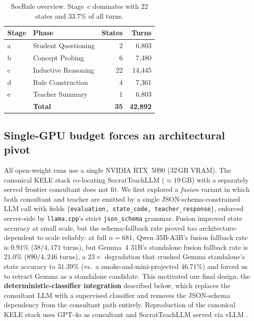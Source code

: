 \documentclass[11pt]{article}
\begin{document}
\begin{table}[t]
  \centering
  \small
  \begin{tabular}{@{}llrr@{}}
    \toprule
    \textbf{Stage} & \textbf{Phase} & \textbf{States} & \textbf{Turns} \\
    \midrule
    a & Student Questioning    & 2  & 6{,}803 \\
    b & Concept Probing        & 6  & 7{,}480 \\
    c & Inductive Reasoning    & 22 & 14{,}445 \\
    d & Rule Construction      & 4  & 7{,}361 \\
    e & Teacher Summary        & 1  & 6{,}803 \\
    \midrule
      & \textbf{Total}         & \textbf{35} & \textbf{42{,}892} \\
    \bottomrule
  \end{tabular}
  \caption{SocRule overview. Stage~c dominates with $22$ states and $33.7\%$ of all turns.}
  \label{tab:socrule}
\end{table}

\subsection{Single-GPU budget forces an architectural pivot}

All open-weight runs use a single NVIDIA RTX~5090 ($32$\,GB VRAM). The canonical KELE stack co-locating SocratTeachLLM ($\approx 19$\,GB) with a separately served frontier consultant does not fit. We first explored a \emph{fusion} variant in which both consultant and teacher are emitted by a single JSON-schema-constrained LLM call with fields $\{$\texttt{evaluation, state\_code, teacher\_response}$\}$, enforced server-side by \texttt{llama.cpp}'s strict \texttt{json\_schema} grammar. Fusion improved state accuracy at small scale, but the schema-fallback rate proved too architecture-dependent to scale reliably: at full $n{=}681$, Qwen 35B-A3B's fusion fallback rate is $0.91\%$ ($38/4{,}171$ turns), but Gemma~4 31B's standalone fusion fallback rate is $21.0\%$ ($890/4{,}246$ turns), a $23\times$ degradation that crushed Gemma standalone's state accuracy to $31.39\%$ (vs.\ a smoke-and-mini-projected $46.71\%$) and forced us to retract Gemma as a standalone candidate. This motivated our final design: the \textbf{deterministic-classifier integration} described below, which replaces the consultant LLM with a supervised classifier and removes the JSON-schema dependency from the consultant path entirely. Reproduction of the canonical KELE stack uses GPT-4o \citep{openai2024gpt4o} as consultant and SocratTeachLLM served via vLLM \citep{kwon2023vllm}.
\end{document}
